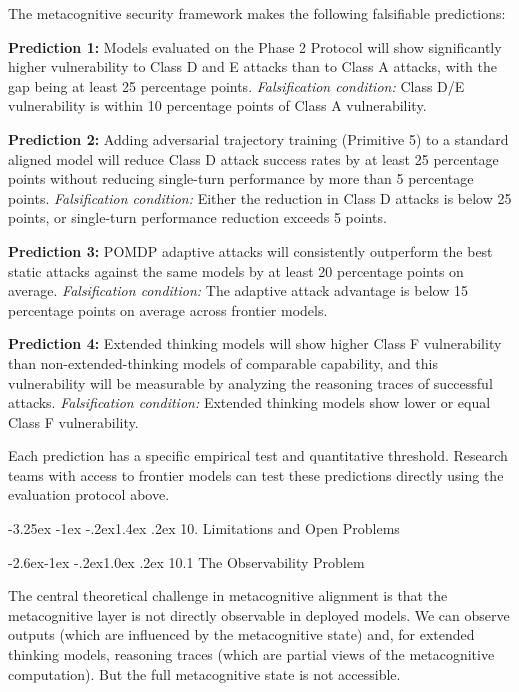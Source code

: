 \documentclass[
  11pt,
]{article}
\makeatletter
\renewcommand\section{\@startsection{section}{1}{\z@}%
  {-3.25ex \@plus -1ex \@minus -.2ex}{1.4ex \@plus.2ex}%
  {\normalfont\sffamily\Large\bfseries}}
\renewcommand\subsection{\@startsection{subsection}{2}{\z@}%
  {-2.6ex\@plus -1ex \@minus -.2ex}{1.0ex \@plus .2ex}%
  {\normalfont\sffamily\large\bfseries}}
\makeatother
\begin{document}
The metacognitive security framework makes the following falsifiable
predictions:

\textbf{Prediction 1:} Models evaluated on the Phase 2 Protocol will
show significantly higher vulnerability to Class D and E attacks than to
Class A attacks, with the gap being at least 25 percentage points.
\emph{Falsification condition:} Class D/E vulnerability is within 10
percentage points of Class A vulnerability.

\textbf{Prediction 2:} Adding adversarial trajectory training (Primitive
5) to a standard aligned model will reduce Class D attack success rates
by at least 25 percentage points without reducing single-turn
performance by more than 5 percentage points. \emph{Falsification
condition:} Either the reduction in Class D attacks is below 25 points,
or single-turn performance reduction exceeds 5 points.

\textbf{Prediction 3:} POMDP adaptive attacks will consistently
outperform the best static attacks against the same models by at least
20 percentage points on average. \emph{Falsification condition:} The
adaptive attack advantage is below 15 percentage points on average
across frontier models.

\textbf{Prediction 4:} Extended thinking models will show higher Class F
vulnerability than non-extended-thinking models of comparable
capability, and this vulnerability will be measurable by analyzing the
reasoning traces of successful attacks. \emph{Falsification condition:}
Extended thinking models show lower or equal Class F vulnerability.

Each prediction has a specific empirical test and quantitative
threshold. Research teams with access to frontier models can test these
predictions directly using the evaluation protocol above.

\section{10. Limitations and Open
Problems}\label{limitations-and-open-problems}

\subsection{10.1 The Observability
Problem}\label{the-observability-problem}

The central theoretical challenge in metacognitive alignment is that the
metacognitive layer is not directly observable in deployed models. We
can observe outputs (which are influenced by the metacognitive state)
and, for extended thinking models, reasoning traces (which are partial
views of the metacognitive computation). But the full metacognitive
state is not accessible.
\end{document}
